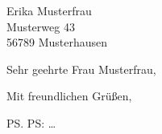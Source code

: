\documentclass[%
  fontsize=12pt, %
  version=last%
]{scrlttr2}
\begin{document}
\begin{letter}{%
  Erika Musterfrau\\
  Musterweg 43\\
  56789 Musterhausen%
}




\opening{Sehr geehrte Frau Musterfrau,}

\closing{Mit freundlichen Grüßen,}


\ps PS: \dots



\end{letter}
\end{document}
